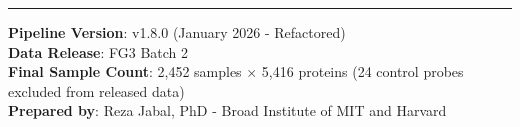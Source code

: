 \documentclass[11pt,a4paper]{article}
\begin{document}
\noindent\rule{8cm}{0.4pt}

\noindent
\textbf{Pipeline Version}: v1.8.0 (January 2026 - Refactored) \\
\textbf{Data Release}: FG3 Batch 2 \\
\textbf{Final Sample Count}: 2,452 samples $\times$ 5,416 proteins (24 control probes excluded from released data)\\
\textbf{Prepared by}: Reza Jabal, PhD - Broad Institute of MIT and Harvard
\end{document}
